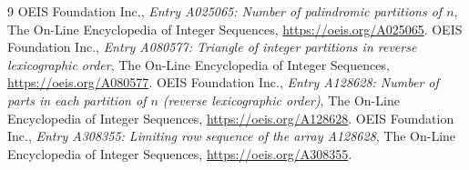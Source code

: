 \documentclass[11pt]{article}
\begin{document}
\begin{thebibliography}{9}
 OEIS Foundation Inc., \emph{Entry A025065: Number of palindromic partitions of $n$}, The On-Line Encyclopedia of Integer Sequences, \url{https://oeis.org/A025065}.
 OEIS Foundation Inc., \emph{Entry A080577: Triangle of integer partitions in reverse lexicographic order}, The On-Line Encyclopedia of Integer Sequences, \url{https://oeis.org/A080577}.
 OEIS Foundation Inc., \emph{Entry A128628: Number of parts in each partition of $n$ (reverse lexicographic order)}, The On-Line Encyclopedia of Integer Sequences, \url{https://oeis.org/A128628}.
 OEIS Foundation Inc., \emph{Entry A308355: Limiting row sequence of the array A128628}, The On-Line Encyclopedia of Integer Sequences, \url{https://oeis.org/A308355}.
\end{thebibliography}
\end{document}
